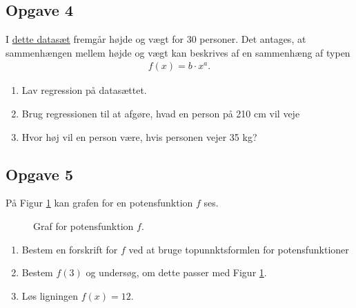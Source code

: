 \documentclass[12pt]{article}
\begin{document}
\subsection*{Opgave 4}

I \href{https://github.com/ChristianJLex/TeachingNotes/raw/master/2023-2024/Data%20og%20lign/H%C3%B8jdeV%C3%A6gt.xlsx}{\color{blue!60} dette datasæt} fremgår højde og vægt for 30 personer. Det antages, at sammenhængen mellem højde og vægt kan beskrives af en sammenhæng af typen
\begin{align*}
	f(x) = b \cdot x^a.
\end{align*}

\begin{enumerate}[label=\roman*)]
	\item Lav regression på datasættet.
	\item Brug regressionen til at afgøre, hvad en person på 210 cm vil veje
	\item Hvor høj vil en person være, hvis personen vejer 35 kg?
\end{enumerate}

\subsection*{Opgave 5}
På Figur \ref{fig:potensopg} kan grafen for en potensfunktion $f$ ses. 
\begin{figure}[H]
	\centering
	\caption{Graf for potensfunktion $f$.}
	\label{fig:potensopg}
\end{figure}

\begin{enumerate}[label=\roman*)]
	\item Bestem en forskrift for $f$ ved at bruge topunnktsformlen for potensfunktioner
	\item Bestem $f(3)$ og undersøg, om dette passer med Figur \ref{fig:potensopg}.
	\item Løs ligningen $f(x) = 12$.
\end{enumerate}
\end{document}
